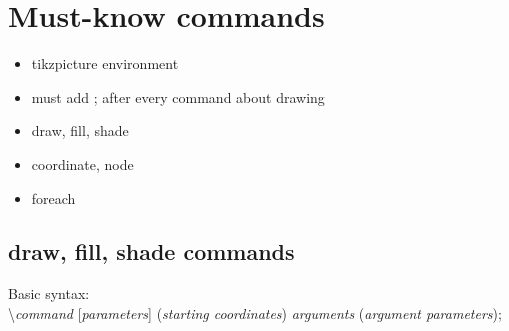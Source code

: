 \documentclass[12pt, a4paper]{article}
\newcommand{\bs}{\textbackslash}
\begin{document}
\section{Must-know commands}
\begin{itemize}
\item tikzpicture environment
\item must add ; after every command about drawing
\item draw, fill, shade
\item coordinate, node
\item foreach
\end{itemize}

\subsection{draw, fill, shade commands}
Basic syntax:\\ \bs\emph{command} [\emph{parameters}] (\emph{starting coordinates}) \emph{arguments} (\emph{argument parameters});
\end{document}
